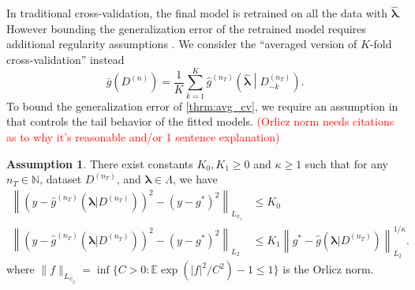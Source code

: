 \documentclass[12pt]{article} %
\theoremstyle{definition}
\newtheorem{assump}{Assumption}
\begin{document}
In traditional cross-validation, the final model is retrained on all the data with $\hat{\boldsymbol{\lambda}}$. However bounding the generalization error of the retrained model requires additional regularity assumptions \citep{lecue2012oracle}. We consider the ``averaged version of $K$-fold cross-validation'' instead
\begin{equation}
\label{thrm:avg_cv}
\bar{g}\left ( {D^{(n)}} \right ) = 
\frac{1}{K} \sum_{k=1}^K 
\hat{g}^{(n_T)} \left (\hat{\boldsymbol \lambda} \middle | D^{(n_T)}_{-k} \right ).
\end{equation}
To bound the generalization error of \eqref{thrm:avg_cv}, we require an assumption in \citet{lecue2012oracle} that controls the tail behavior of the fitted models. \textcolor{red}{(Orlicz norm needs citations as to why it's reasonable and/or 1 sentence explanation)}
\begin{assump}
	\label{assump:tail_margin}
	There exist constants $K_0, K_1 \ge 0$ and $\kappa \ge 1$ such that for any $n_T \in \mathbb{N}$, dataset $D^{(n_T)}$, and $\boldsymbol{\lambda} \in \Lambda$, we have
	\begin{align}
	\left \|
	\left(
	y - \hat{g}^{(n_T)}(\boldsymbol{\lambda} | D^{(n_T)})
	\right)^2
	- \left(
	y - g^*
	\right)^2
	\right \|_{L_{\psi_1}} & \le K_0
	\label{eq:cv_assump1}\\
	\left \|
	\left(
	y - \hat{g}^{(n_T)}(\boldsymbol{\lambda} | D^{(n_T)})
	\right)^2
	- \left(
	y - g^*
	\right)^2
	\right \|_{L_2}
	& \le 
	K_1 \left \|
	g^{*}-\hat{g}(\boldsymbol{\lambda}|D^{(n_{T})})
	\right \|_{L_{2}}^{1/\kappa}.
	\label{eq:cv_assump2}
	\end{align}
	where $\|f\|_{L_{\psi_2}}= \inf \{C > 0: \mathbb{E}\exp(|f|^2/C^2) - 1 \le 1\}$ is the Orlicz norm.
\end{assump}
\end{document}
